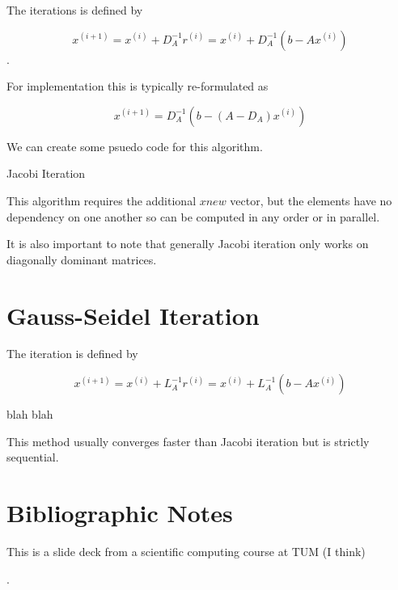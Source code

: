 \documentclass{report}
\begin{document}
The iterations is defined by

$$x^{(i + 1)} = x^{(i)} + D_A^{-1}r^{(i)} = x^{(i)}+D_A^{-1}\left(b - Ax^{(i)}\right)$$.

For implementation this is typically re-formulated as

$$x^{(i+1)} = D_A^{-1}\left(b - (A - D_A)x^{(i)}\right)$$

We can create some psuedo code for this algorithm.

\begin{algorithm}
  \caption{Jacobi Iteration}
  \begin{algorithmic}
  \EndFor
  \EndFor
  \end{algorithmic}
\end{algorithm}

This algorithm requires the additional $xnew$ vector, but the elements have no
dependency on one another so can be computed in any order or in parallel.

It is also important to note that generally Jacobi iteration only works on
diagonally dominant matrices.

\section{Gauss-Seidel Iteration}

The iteration is defined by

$$x^{(i+1)} = x^{(i)} + L_A^{-1}r^{(i)} = x^{(i)} + L_A^{-1}\left( b - Ax^{(i)}
\right)$$

blah blah

This method usually converges faster than Jacobi iteration but is strictly sequential.

\section{Bibliographic Notes}

This is a slide deck from a scientific computing course at TUM (I think)

\cite{Bader2013}.

\printbibliography
\end{document}

